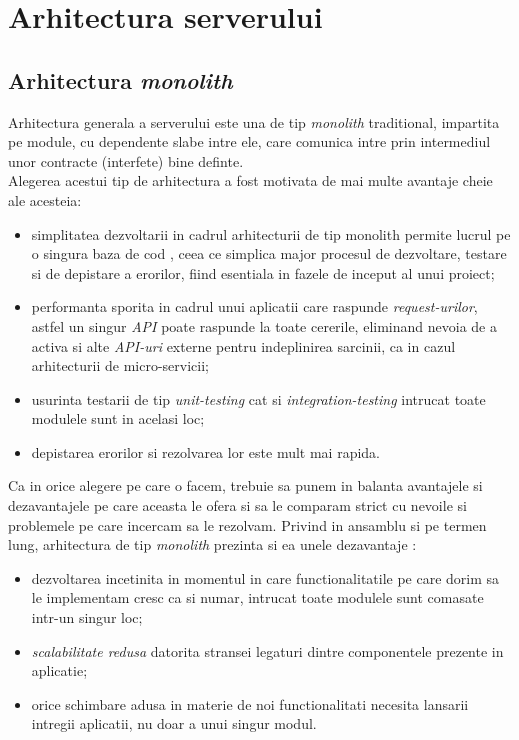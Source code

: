 \section{Arhitectura serverului}

\subsection*{Arhitectura \textit{monolith}}

Arhitectura generala a serverului este una de tip \textit{monolith} traditional, impartita pe module, cu dependente slabe intre ele, care comunica intre prin intermediul unor contracte (interfete) bine definte.\\
Alegerea acestui tip de arhitectura a fost motivata de mai multe avantaje cheie ale acesteia: 
\begin{itemize}
	\item simplitatea dezvoltarii in cadrul arhitecturii de tip monolith permite lucrul pe o singura baza de cod , ceea ce simplica major procesul de dezvoltare, testare si de depistare a erorilor, fiind esentiala in fazele de inceput al unui proiect;
	
	\item  performanta sporita in cadrul unui aplicatii care raspunde \textit{request-urilor}, astfel un singur \textit{API} poate raspunde la toate cererile, eliminand nevoia de a activa si alte \textit{API-uri} externe pentru indeplinirea sarcinii, ca in cazul arhitecturii de micro-servicii;
	
	\item usurinta testarii de tip \textit{unit-testing} cat si \textit{integration-testing} intrucat toate modulele sunt in acelasi loc;
	
	\item  depistarea erorilor si rezolvarea lor este mult mai rapida.
\end{itemize}
Ca in orice alegere pe care o facem, trebuie sa punem in balanta avantajele si dezavantajele pe care aceasta le ofera si sa le comparam strict cu nevoile si problemele pe care incercam sa le rezolvam. Privind in ansamblu si pe termen lung, arhitectura de tip \textit{monolith} prezinta si ea unele dezavantaje : 

\begin{itemize}

 \item dezvoltarea incetinita in momentul in care functionalitatile pe care dorim sa le implementam cresc ca si numar, intrucat toate modulele sunt comasate intr-un singur loc;
 
 \item \textit{scalabilitate redusa} datorita stransei legaturi dintre componentele prezente in aplicatie;
 
 \item 	orice schimbare adusa in materie de noi functionalitati necesita lansarii intregii aplicatii, nu doar a unui singur modul.

\end{itemize}

